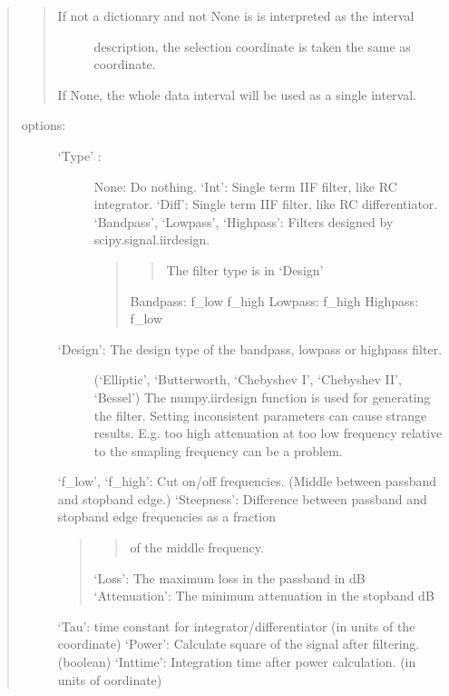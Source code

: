 \documentclass[letterpaper,10pt,english]{sphinxmanual}
\begin{document}
\begin{fulllineitems}
\begin{fulllineitems}
\begin{quote}
\begin{quote}
\begin{description}
\item[{If not a dictionary and not None is is interpreted as the interval}] \leavevmode
description, the selection coordinate is taken the same as
coordinate.

\end{description}

If None, the whole data interval will be used as a single interval.
\end{quote}
\begin{description}
\item[{options:}] \leavevmode\begin{description}
\item[{‘Type’ :}] \leavevmode
None: Do nothing.
‘Int’: Single term IIF filter, like RC integrator.
‘Diff’: Single term IIF filter, like RC differentiator.
‘Bandpass’, ‘Lowpass’, ‘Highpass’: Filters designed by scipy.signal.iirdesign.
\begin{quote}
\begin{quote}

The filter type is in ‘Design’
\end{quote}

Bandpass: f\_low \sphinxhyphen{} f\_high
Lowpass: \sphinxhyphen{} f\_high
Highpass: \sphinxhyphen{} f\_low
\end{quote}

\item[{‘Design’: The design type of the bandpass, lowpass or highpass filter.}] \leavevmode
(‘Elliptic’, ‘Butterworth, ‘Chebyshev I’, ‘Chebyshev II’, ‘Bessel’)
The numpy.iirdesign function is used for generating the filter.
Setting inconsistent parameters can cause strange results. E.g. too high attenuation
at too low frequency relative to the smapling frequency can be a problem.

\end{description}

‘f\_low’, ‘f\_high’: Cut on/off frequencies. (Middle between passband and stopband edge.)
‘Steepness’: Difference between passband and stopband edge frequencies as a fraction
\begin{quote}
\begin{quote}

of the middle frequency.
\end{quote}

‘Loss’: The maximum loss in the passband in dB
‘Attenuation’: The minimum attenuation in the stopband dB
\end{quote}

‘Tau’: time constant for integrator/differentiator (in units of the coordinate)
‘Power’: Calculate square of the signal after filtering. (boolean)
‘Inttime’: Integration time after power calculation. (in units of oordinate)


\end{description}
\end{quote}
\end{fulllineitems}
\end{fulllineitems}
\end{document}

